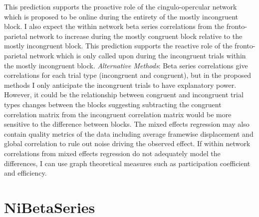 \documentclass[phd,appendix,figures]{uithesis}
\begin{document}
This prediction supports the proactive role of the cingulo-opercular network which is proposed to be online during the entirety of the mostly incongruent block.
I also expect the within network beta series correlations from the fronto-parietal network to increase during the mostly congruent block relative to the mostly incongruent block.
This prediction supports the reactive role of the fronto-parietal network which is only called upon during the incongruent trials within the mostly incongruent block.
\newline
\newline
\textit{Alternative Methods}:
Beta series correlations give correlations for each trial type (incongruent and congruent), but in the proposed methods I only anticipate the incongruent trials to have explanatory power.
However, it could be the relationship between congruent and incongruent trial types changes between the blocks suggesting subtracting the congruent correlation matrix from the incongruent correlation matrix would be more sensitive to the difference between blocks.
The mixed effects regression may also contain quality metrics of the data including average framewise displacement and global correlation to rule out noise driving the observed effect. 
If within network correlations from mixed effects regression do not adequately model the differences, I can use graph theoretical measures such as participation coefficient and efficiency.
\newline

\chapter{NiBetaSeries}
\end{document}
